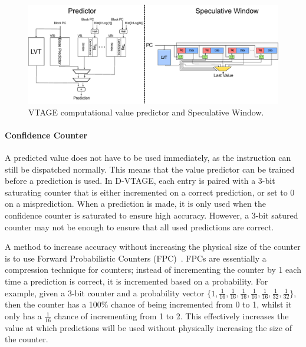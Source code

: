 \begin{figure}[t]
    \centering
    \includegraphics[width=1\textwidth]{background/graphics/valuepred.pdf}
	\vspace{-3em}
    \caption{VTAGE computational value predictor and Speculative Window.}
    \label{fig:stride_over}
	\vspace{-1em}
\end{figure}

\paragraph*{Confidence Counter}
A predicted value does not have to be used immediately, as the instruction can still be dispatched normally.
This means that the value predictor can be trained before a prediction is used.
In D-VTAGE, each entry is paired with a 3-bit saturating counter that is either incremented on a correct prediction, or set to 0 on a misprediction.
When a prediction is made, it is only used when the confidence counter is saturated to ensure high accuracy.
However, a 3-bit satured counter may not be enough to ensure that all used predictions are correct.

A method to increase accuracy without increasing the physical size of the counter is to use Forward Probabilistic Counters (FPC)~\cite{riley2006fpc}.
FPCs are essentially a compression technique for counters; instead of incrementing the counter by 1 each time a prediction is correct, it is incremented based on a probability.
For example, given a 3-bit counter and a probability vector  $\{1,\frac{1}{16},\frac{1}{16},\frac{1}{16},\frac{1}{16},\frac{1}{16},\frac{1}{32},\frac{1}{32}\}$, then the counter has a 100\% chance of being incremented from 0 to 1, whilst it only has a $\frac{1}{16}$ chance of incrementing from 1 to 2.
This effectively increases the value at which predictions will be used without physically increasing the size of the counter. 

